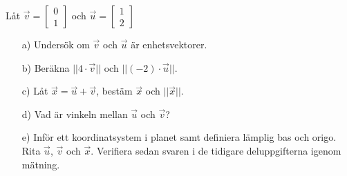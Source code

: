 Låt $\vec{v} =  \begin{bmatrix} 0 \\ 1 \end{bmatrix}$ och $\vec{u} = \begin{bmatrix} 1 \\ 2 \end{bmatrix}$
\begin{itemize}
\item[a) ] Undersök om $\vec{v}$ och $\vec{u}$ är enhetsvektorer.
\item[b) ] Beräkna $||4 \cdot \vec{v}||$ och $||(-2) \cdot \vec{u}||$.
\item[c) ] Låt $\vec{x} = \vec{u} + \vec{v}$, bestäm $\vec{x}$ och $||\vec{x}||$.
\item[d) ] Vad är vinkeln mellan $\vec{u}$ och $\vec{v}$?
\item[e) ] Inför ett koordinatsystem i planet samt definiera lämplig bas och origo. Rita $\vec{u}$, $\vec{v}$ och $\vec{x}$. Verifiera sedan svaren i de tidigare deluppgifterna igenom mätning. 
\end{itemize}